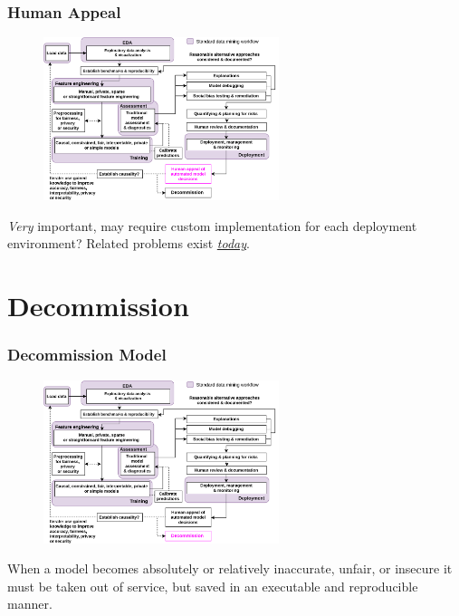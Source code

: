 \documentclass[11pt,
               aspectratio=169,
               hyperref={colorlinks}
               ]{beamer}
\begin{document}
		\begin{frame}	
			\frametitle{Human Appeal}		
			
			\begin{figure}[htb]
				\begin{center}
					\includegraphics[height=135pt]{../img/ha.png}
				\end{center}
			\end{figure}	

			\footnotesize{\textit{Very} important, may require custom implementation for each deployment environment? Related problems exist \href{https://www.nytimes.com/2017/06/13/opinion/how-computers-are-harming-criminal-justice.html}{\textit{today}}}.

		\end{frame}
		
	\section{Decommission}

		\begin{frame}	
			\frametitle{Decommission Model}		
			
			\begin{figure}[htb]
				\begin{center}
					\includegraphics[height=135pt]{../img/zde.png}
				\end{center}
			\end{figure}	

			\footnotesize{When a model becomes absolutely or relatively inaccurate, unfair, or insecure it must be taken out of service, but saved in an executable and reproducible manner.}

		\end{frame}
\end{document}
